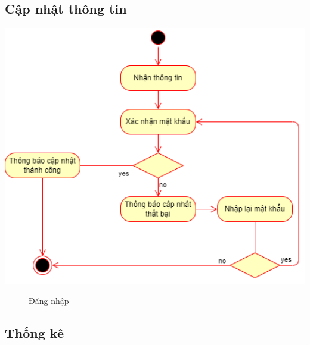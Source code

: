 \subsection{Cập nhật thông tin}
  \begin{center}
    \includegraphics[width=1.1\textwidth]{image/activity/updatedata.png}
    \begin{figure}
      \centering
      \caption{Đăng nhập}
    \end{figure}
  \end{center}

\subsection{Thống kê}


